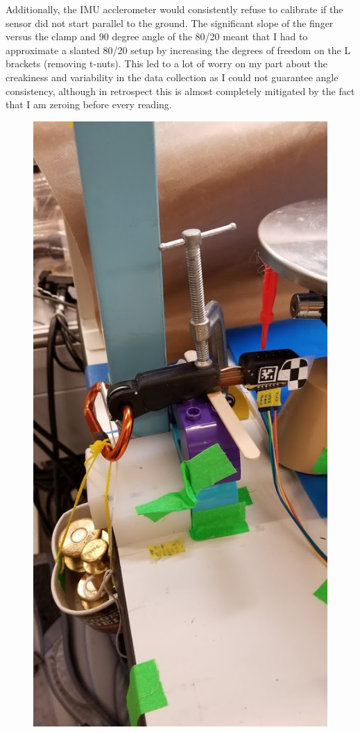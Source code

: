 \documentclass[preprint,12pt,3p]{elsarticle}
\begin{document}
Additionally, the IMU acclerometer would consistently refuse to calibrate if the sensor did not
start parallel to the ground. The significant slope of the finger versus the clamp and 90 degree
angle of the 80/20 meant that I had to approximate a slanted 80/20 setup by increasing the degrees
of freedom on the L brackets (removing t-nuts). This led to a lot of worry on my part about the
creakiness and variability in the data collection as I could not guarantee angle consistency,
although in retrospect this is almost completely mitigated by the fact that I am zeroing before
every reading. 

\begin{figure}[H]
\centering
\includegraphics[width=.15\textheight]{images/setup/leveling.jpg}
\end{figure}
\end{document}
